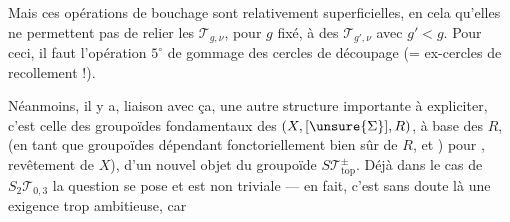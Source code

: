 Mais ces opérations de bouchage sont relativement superficielles, en cela qu'elles ne permettent pas de relier les $\mathcal T_{g,\nu}$, pour $g$ fixé, à des $\mathcal T_{g',\nu}$ avec $g'<g$. Pour ceci, il faut l'opération \textcircled{$5^\circ$} de gommage des cercles de découpage (= ex-cercles de recollement !).

Néanmoins, il y a,   liaison avec ça, une autre structure importante à expliciter, c'est celle  des groupoïdes fondamentaux  des $(X,[\unsure{\Sigma}],R)$,  à base des $R$, (en tant que groupoïdes dépendant fonctoriellement bien sûr de $R$, et   ) pour    ,   revêtement  de $X$), d'un nouvel objet du  groupoïde $S\mathcal T_{\mathrm{top}}^\pm$. Déjà dans le cas de $S_2\mathcal T_{0,3}$ la question se pose et est non triviale --- en fait, c'est sans doute là une exigence trop ambitieuse, car

